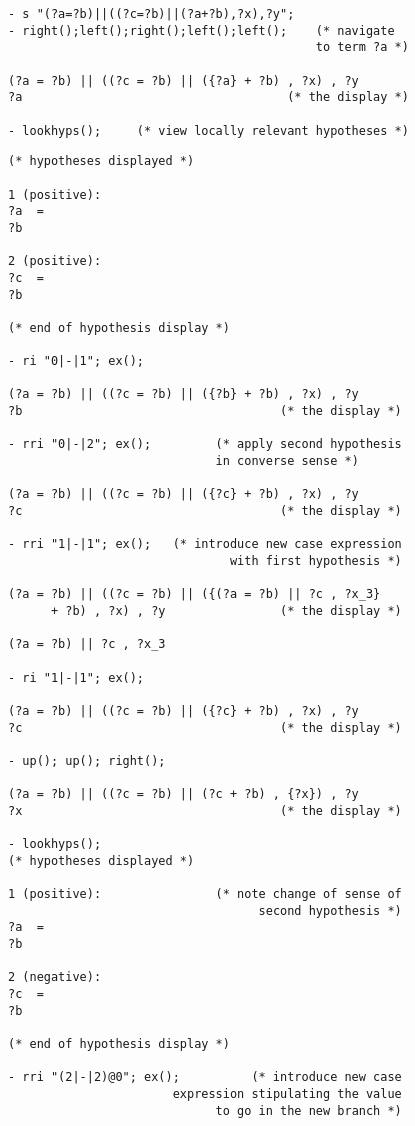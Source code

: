 \documentclass{kluwer}
\begin{document}
\begin{article}
\begin{verbatim}
- s "(?a=?b)||((?c=?b)||(?a+?b),?x),?y";
- right();left();right();left();left();    (* navigate 
                                           to term ?a *)

(?a = ?b) || ((?c = ?b) || ({?a} + ?b) , ?x) , ?y  
?a                                     (* the display *)

- lookhyps();     (* view locally relevant hypotheses *)
\end{verbatim}
\newpage
\begin{verbatim}
(* hypotheses displayed *)

1 (positive):  
?a  =  
?b

2 (positive):  
?c  =  
?b

(* end of hypothesis display *)

- ri "0|-|1"; ex();

(?a = ?b) || ((?c = ?b) || ({?b} + ?b) , ?x) , ?y  
?b                                    (* the display *)

- rri "0|-|2"; ex();         (* apply second hypothesis 
                             in converse sense *)

(?a = ?b) || ((?c = ?b) || ({?c} + ?b) , ?x) , ?y  
?c                                    (* the display *)

- rri "1|-|1"; ex();   (* introduce new case expression 
                               with first hypothesis *)

(?a = ?b) || ((?c = ?b) || ({(?a = ?b) || ?c , ?x_3} 
      + ?b) , ?x) , ?y                (* the display *)

(?a = ?b) || ?c , ?x_3

- ri "1|-|1"; ex();

(?a = ?b) || ((?c = ?b) || ({?c} + ?b) , ?x) , ?y  
?c                                    (* the display *)

- up(); up(); right();

(?a = ?b) || ((?c = ?b) || (?c + ?b) , {?x}) , ?y  
?x                                    (* the display *)

- lookhyps();
(* hypotheses displayed *)

1 (positive):                (* note change of sense of 
                                   second hypothesis *)
?a  =  
?b

2 (negative):  
?c  =  
?b

(* end of hypothesis display *)

- rri "(2|-|2)@0"; ex();          (* introduce new case 
                       expression stipulating the value
                             to go in the new branch *)


\end{verbatim}
\end{article}
\end{document}

